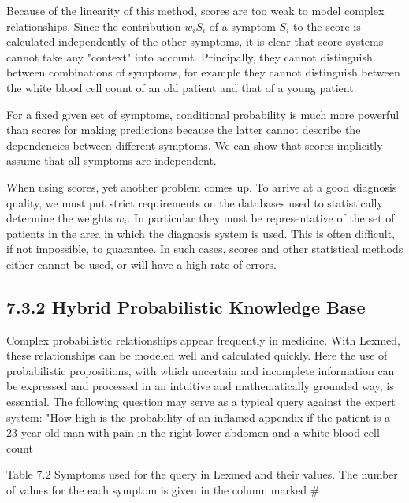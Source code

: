 \documentclass[10pt]{book}
\begin{document}
\begin{center}
\begin{enumerate}
Because of the linearity of this method, scores are too weak to model complex relationships. Since the contribution $w_{i} S_{i}$ of a symptom $S_{i}$ to the score is calculated independently of the other symptoms, it is clear that score systems cannot take any "context" into account. Principally, they cannot distinguish between combinations of symptoms, for example they cannot distinguish between the white blood cell count of an old patient and that of a young patient.

For a fixed given set of symptoms, conditional probability is much more powerful than scores for making predictions because the latter cannot describe the dependencies between different symptoms. We can show that scores implicitly assume that all symptoms are independent.

When using scores, yet another problem comes up. To arrive at a good diagnosis quality, we must put strict requirements on the databases used to statistically determine the weights $w_{i}$. In particular they must be representative of the set of patients in the area in which the diagnosis system is used. This is often difficult, if not impossible, to guarantee. In such cases, scores and other statistical methods either cannot be used, or will have a high rate of errors.

\subsection*{7.3.2 Hybrid Probabilistic Knowledge Base}
Complex probabilistic relationships appear frequently in medicine. With Lexmed, these relationships can be modeled well and calculated quickly. Here the use of probabilistic propositions, with which uncertain and incomplete information can be expressed and processed in an intuitive and mathematically grounded way, is essential. The following question may serve as a typical query against the expert system: "How high is the probability of an inflamed appendix if the patient is a 23-year-old man with pain in the right lower abdomen and a white blood cell count

Table 7.2 Symptoms used for the query in Lexmed and their values. The number of values for the each symptom is given in the column marked \#



\end{enumerate}
\end{center}
\end{document}
